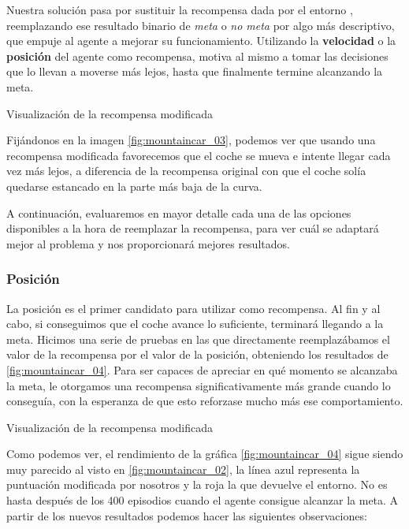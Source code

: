 Nuestra solución pasa por sustituir la recompensa dada por el entorno \citep{mediumTim}, reemplazando ese resultado binario de \textit{meta} o \textit{no meta} por algo más descriptivo, que empuje al agente a mejorar su funcionamiento. Utilizando la \textbf{velocidad} o la \textbf{posición} del agente como recompensa, motiva al mismo a tomar las decisiones que lo llevan a moverse más lejos, hasta que finalmente termine alcanzando la meta.

%
       {Visualización de la recompensa modificada}

Fijándonos en la imagen \ref{fig:mountaincar_03}, podemos ver que usando una recompensa modificada favorecemos que el coche se mueva e intente llegar cada vez más lejos, a diferencia de la recompensa original con que el coche solía quedarse estancado en la parte más baja de la curva.

A continuación, evaluaremos en mayor detalle cada una de las opciones disponibles a la hora de reemplazar la recompensa, para ver cuál se adaptará mejor al problema y nos proporcionará mejores resultados.


\subsubsection*{Posición}

La posición es el primer candidato para utilizar como recompensa. Al fin y al cabo, si conseguimos que el coche avance lo suficiente, terminará llegando a la meta. Hicimos una serie de pruebas en las que directamente reemplazábamos el valor de la recompensa por el valor de la posición, obteniendo los resultados de \ref{fig:mountaincar_04}. Para ser capaces de apreciar en qué momento se alcanzaba la meta, le otorgamos una recompensa significativamente más grande cuando lo conseguía, con la esperanza de que esto reforzase mucho más ese comportamiento.

%
       {Visualización de la recompensa modificada}

Como podemos ver, el rendimiento de la gráfica \ref{fig:mountaincar_04} sigue siendo muy parecido al visto en  \ref{fig:mountaincar_02}, la línea azul representa la puntuación modificada por nosotros y la roja la que devuelve el entorno. No es hasta después de los 400 episodios cuando el agente consigue alcanzar la meta. A partir de los nuevos resultados podemos hacer las siguientes observaciones:

